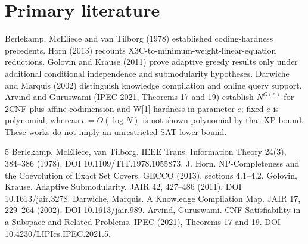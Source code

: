 \documentclass{article}
\begin{document}
\section{Primary literature}
Berlekamp, McEliece and van Tilborg (1978) established coding-hardness precedents. Horn (2013) recounts X3C-to-minimum-weight-linear-equation reductions. Golovin and Krause (2011) prove adaptive greedy results only under additional conditional independence and submodularity hypotheses. Darwiche and Marquis (2002) distinguish knowledge compilation and online query support. Arvind and Guruswami (IPEC 2021, Theorems 17 and 19) establish $N^{O(e)}$ for 2CNF plus affine codimension and W[1]-hardness in parameter $e$; fixed $e$ is polynomial, whereas $e=O(\log N)$ is not shown polynomial by that XP bound. These works do not imply an unrestricted SAT lower bound.


\begin{thebibliography}{5}
 Berlekamp, McEliece, van Tilborg. IEEE Trans. Information Theory 24(3), 384--386 (1978). DOI 10.1109/TIT.1978.1055873.
 J. Horn. NP-Completeness and the Coevolution of Exact Set Covers. GECCO (2013), sections 4.1--4.2.
 Golovin, Krause. Adaptive Submodularity. JAIR 42, 427--486 (2011). DOI 10.1613/jair.3278.
 Darwiche, Marquis. A Knowledge Compilation Map. JAIR 17, 229--264 (2002). DOI 10.1613/jair.989.
 Arvind, Guruswami. CNF Satisfiability in a Subspace and Related Problems. IPEC (2021), Theorems 17 and 19. DOI 10.4230/LIPIcs.IPEC.2021.5.
\end{thebibliography}
\end{document}
